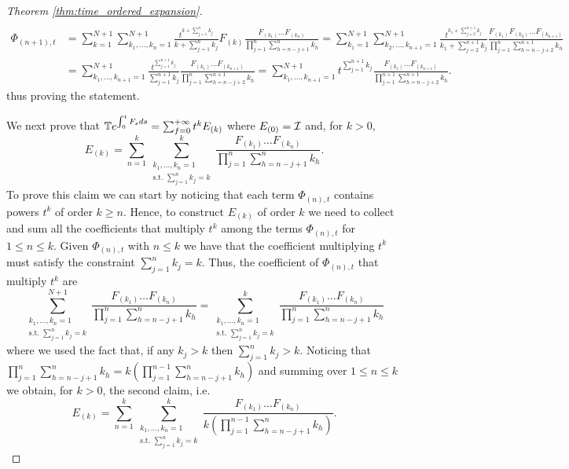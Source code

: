 \begin{proof}[Theorem \ref{thm:time_ordered_expansion}]
\begin{align*}
    \end{align*}
    \begin{align*} \Phi_{(n+1),t}       
        &= \sum_{k=1}^{N+1} \sum_{k_1,\dots,k_n=1}^{N+1} \frac{t^{k+\sum_{j=1}^n k_j}}{k+\sum_{j=1}^n k_j} F_{(k)} \frac{F_{(k_1)}\dots F_{(k_n)}}{\prod_{j=1}^n \sum_{h=n-j+1}^n k_h} 
        = \sum_{k_1=1}^{N+1} \sum_{k_2,\dots,k_{n+1}=1}^{N+1} \frac{t^{k_1+\sum_{j=2}^{n+1} k_j}}{k_1+\sum_{j=2}^{n+1} k_j} \frac{F_{(k_1)}F_{(k_2)}\dots F_{(k_{n+1})}}{\prod_{j=1}^{n} \sum_{h=n-j+2}^{n+1} k_h}\\
        &= \sum_{k_1,\dots,k_{n+1}=1}^{N+1} \frac{t^{\sum_{j=1}^{n+1} k_j}}{\sum_{j=1}^{n+1} k_j} \frac{F_{(k_1)}\dots F_{(k_{n+1})}}{\prod_{j=1}^{n} \sum_{h=n-j+2}^{n+1} k_h}
        = \sum_{k_1,\dots,k_{n+1}=1}^{N+1} t^{\sum_{j=1}^{n+1} k_j} \frac{F_{(k_1)}\dots F_{(k_{n+1})}}{\prod_{j=1}^{n+1} \sum_{h=n-j+2}^{n+1} k_h}.
    \end{align*}
    thus proving the statement.

    We next prove that \(\mathbb{T} e^{\int_0^t F_s ds} = \sum_{f=0}^{+\infty} t^k E_{(k)}\) where $E_{(0)} = \mathcal{I}$ and, for $k>0$,
    \[ E_{(k)} = \sum_{n=1}^k \sum_{\substack{{k_1,\dots,k_{n} = 1}\\{\text{s.t. }\sum_{j=1}^{n}k_{j}=k}}}^{k} \frac{F_{(k_1)}\dots F_{(k_n)} }{\prod_{j=1}^n \sum_{h=n-j+1}^n k_h}. \]
    To prove this claim we can start by noticing that each term $\Phi_{(n),t}$ contains powers $t^k$ of order $k\geq n$. Hence, to construct $E_{(k)}$ of order $k$ we need to collect and sum all the coefficients that multiply $t^k$ among the terms $\Phi_{(n),t}$ for $1\leq n\leq k$. Given $\Phi_{(n),t}$ with $n\leq k$ we have that the coefficient multiplying $t^k$ must satisfy the constraint $\sum_{j=1}^n k_j = k$. 
    Thus, the coefficient of $\Phi_{(n),t}$ that multiply $t^k$ are
    \[\sum_{\substack{{k_1,\dots,k_{n} = 1}\\{\text{s.t. }\sum_{j=1}^{n}k_{j}=k}}}^{N+1} \frac{ F_{(k_1)}\dots F_{(k_n)}}{\prod_{j=1}^n \sum_{h=n-j+1}^n k_h} = \sum_{\substack{{k_1,\dots,k_{n} = 1}\\{\text{s.t. }\sum_{j=1}^{n}k_{j}=k}}}^{k} \frac{ F_{(k_1)}\dots F_{(k_n)}}{\prod_{j=1}^n \sum_{h=n-j+1}^n k_h}\]
    where we used the fact that, if any $k_j>k$ then $\sum_{j=1}^n k_j>k$.  
    Noticing that $\prod_{j=1}^n \sum_{h=n-j+1}^n k_h = k(\prod_{j=1}^{n-1} \sum_{h=n-j+1}^n k_h)$ and summing over $1\leq n\leq k$ we obtain, for $k>0$, the second claim, i.e.  
    \[E_{(k)} = \sum_{n=1}^{k} \sum_{\substack{{k_1,\dots,k_{n} = 1}\\{\text{s.t. }\sum_{j=1}^{n}k_{j}=k}}}^{k} \frac{ F_{(k_1)}\dots F_{(k_n)}}{k(\prod_{j=1}^{n-1} \sum_{h=n-j+1}^n k_h)}.\]


\end{proof}
